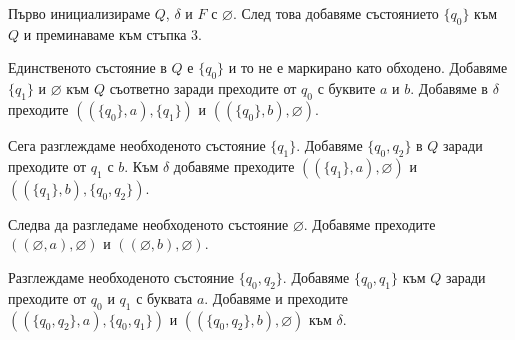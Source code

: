 \documentclass[openany]{book}
\begin{document}
        \begin{center}
        \end{center}
    
        Първо инициализираме $Q$, $\delta$ и $F$ с $\varnothing$. След това добавяме състоянието
        $\{q_0\}$ към $Q$ и преминаваме към стъпка 3. \\
    
        \vspace{5pt}
    
        Единственото състояние в $Q$ е $\{q_0\}$ и то не е маркирано като обходено. 
        Добавяме $\{q_1\}$ и $\varnothing$ към $Q$ съответно заради преходите от $q_0$ с
        буквите $a$ и $b$. Добавяме в $\delta$ преходите $((\{q_0\},a),\{q_1\})$ и 
        $((\{q_0\},b),\varnothing)$.\\
    
        \vspace{5pt}
    
        Сега разглеждаме необходеното състояние $\{q_1\}$. Добавяме $\{q_0,q_2\}$ в $Q$
        заради преходите от $q_1$ с $b$. Към $\delta$ добавяме преходите
        $((\{q_1\},a),\varnothing)$ и \\
        $((\{q_1\},b),\{q_0,q_2\})$.
    
        \vspace{5pt}
    
        Следва да разгледаме необходеното състояние $\varnothing$. Добавяме преходите
        $((\varnothing,a),\varnothing)$ и $((\varnothing,b),\varnothing)$.
    
        \vspace{5pt}
    
        Разглеждаме необходеното състояние $\{q_0,q_2\}$. Добавяме $\{q_0,q_1\}$ към
        $Q$ заради преходите от $q_0$ и $q_1$ с буквата $a$. Добавяме и преходите \\ 
        $((\{q_0,q_2\},a),\{q_0,q_1\})$ и $((\{q_0,q_2\},b),\varnothing)$ към $\delta$.
    
\end{document}
